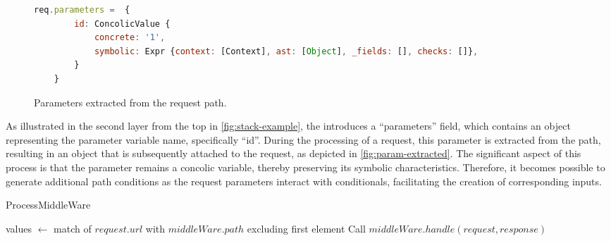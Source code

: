 \begin{figure}[ht]
    \begin{lstlisting}[language=JavaScript, gobble=4]
    req.parameters =  {
        id: ConcolicValue {
            concrete: '1',
            symbolic: Expr {context: [Context], ast: [Object], _fields: [], checks: []},
        }
    }
    \end{lstlisting}
    \caption{Parameters extracted from the request path.}
    \label{fig:param-extracted}
\end{figure}
As illustrated in the second layer from the top in \autoref{fig:stack-example}, the  introduces a “parameters” field, which contains an object representing the parameter variable name, specifically “id”. During the processing of a request, this parameter is extracted from the path, resulting in an object that is subsequently attached to the request, as depicted in \autoref{fig:param-extracted}.
The significant aspect of this process is that the parameter remains a concolic variable, thereby preserving its symbolic characteristics. Therefore, it becomes possible to generate additional path conditions as the request parameters interact with conditionals, facilitating the creation of corresponding inputs.

\begin{algorithm}[ht]
\caption{ProcessMiddleWare}
values $\gets$ match of $request.url$ with $middleWare.path$ excluding first element\;
Call $middleWare.handle(request, response)$\;
\end{algorithm}




